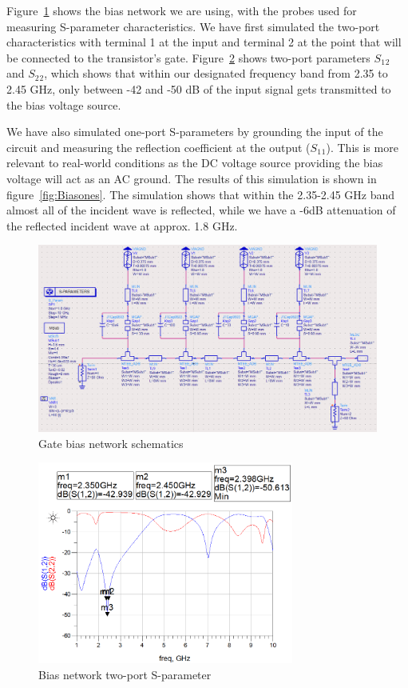   Figure~\ref{fig:Biasschem} shows the bias network we are using, with the probes used for measuring S-parameter characteristics. We have first simulated the two-port characteristics with terminal 1 at the input and terminal 2 at the point that will be connected to the transistor's gate. Figure~\ref{fig:Biastwos} shows two-port parameters $S_1$$_2$ and $S_2$$_2$, which shows that within our designated frequency band from 2.35 to 2.45 GHz, only between -42 and -50 dB of the input signal gets transmitted to the bias voltage source.

  We have also simulated one-port S-parameters by grounding the input of the circuit and measuring the reflection coefficient at the output ($S_1$$_1$). This is more relevant to real-world conditions as the DC voltage source providing the bias voltage will act as an AC ground. The results of this simulation is shown in figure~\ref{fig:Biasones}. The simulation shows that within the 2.35-2.45 GHz band almost all of the incident wave is reflected, while we have a -6dB attenuation of the reflected incident wave at approx. 1.8 GHz.

  \begin{figure}[h]
	  \label{fig:Biasschem}
	  \centering
	  \includegraphics[width=\textwidth]{img/Bias_filter_two_port}
	  \caption{Gate bias network schematics}
  \end{figure}

  \begin{figure}[h]
	  \label{fig:Biastwos}
	  \centering
	  \includegraphics[width=0.75\textwidth]{img/Bias_filter_two_port_s_parm}
	  \caption{Bias network two-port S-parameter}
  \end{figure}


